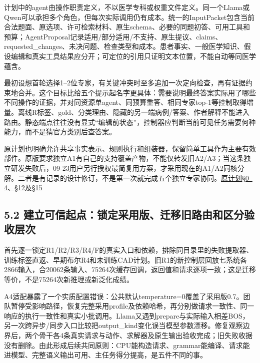\documentclass[
  11pt,
  a4paper,
]{article}
\begin{document}
计划中的agent由操作职责定义，不以医学专科或权重文件定义。同一个Llama或Qwen可以承担多个角色，但每次实际调用仍有成本。统一的InputPacket包含当前合法题面、原选项、许可检索材料、原生schema、必要的同题初答、可用工具和预算；AgentProposal记录适用/部分适用/不支持、原生提议、claims、requested\_changes、未决问题、检查类型和成本。患者事实、一般医学知识、假设编辑和真实工具结果应分开；可定位的引用只证明文本位置，不能自动等同医学蕴含。

最初设想首轮选择1--2位专家，有关键冲突时至多追加一次定向检查，再有证据约束地合并。这个目标比给五个提示起名字更具体：需要说明最终答案实际用了哪些不同操作的证据，并对同资源单agent、同预算重答、相同专家top-1等控制取得增量。离线R标签、gold、分类理由、隐藏的另一端病例/答案、作者解释不能进入路由。静态端点往往没有显式``编辑前状态''，控制器应判断当前可见任务需要何种能力，而不是猜官方类别后查答案。

原计划也明确允许共享事实表示、规则执行和组装器，保留简单工具作为主要有效部件。原版要求独立A1有自己的支持覆盖产物，不能仅转发旧A2/A3；当这条独立研发失败后，09-23用户另行授权最简复用方案，才采用现在的A1/A2同核分解。二者是有记录的设计修订，不是第一次就完成五个独立专家协同。\href{https://github.com/xiotakut/cf_mrg/blob/main/papers/2026-10-02_cf_moa/author_dossier/sources/4d27d8ddefd6_CF_MED_MoA_Router_Five_Agents_Execution_Plan.md}{原计划§0--4、§12及§15}

\subsection{5.2
建立可信起点：锁定采用版、迁移旧路由和区分验收层次}\label{ux5efaux7acbux53efux4fe1ux8d77ux70b9ux9501ux5b9aux91c7ux7528ux7248ux8fc1ux79fbux65e7ux8defux7531ux548cux533aux5206ux9a8cux6536ux5c42ux6b21}

首先逐一锁定R1/R2/R3/R4/F的真实入口和依赖，排除同目录里的失败提取器、训练标签直返、早期布尔R4和未训练CAD计划。旧R1的新控制层回放七系统各2866输入，合20062条输入、75264次缓存回调，返回值和请求逐项一致；这是迁移等价，不是75264次新推理或新泛化成绩。

A4适配暴露了一个实质配置错误：公共默认temperature=0覆盖了采用版0.7。团队暂停受影响路径，恢复完整采用profile及依赖哈希，再分别做请求一致性、同一响应的执行一致性和真实小批调用。Llama又遇到prepare与实际输入相差BOS，另一次跨异步/同步入口比较把output\_kind变化误当模型参数漂移。修复观察边界后，两个骨干各4条真实请求与动作、求解器及原生输出验收完成；旧失败收据没有删除。由此形成后续共同原则：CPU能构造请求、grammar能编译、请求能进模型、完整语义输出可用、主任务得分提高，是五件不同的事。
\end{document}
